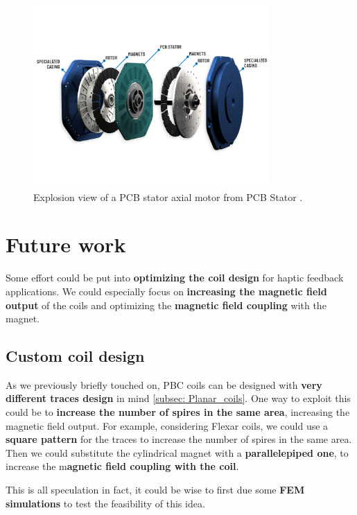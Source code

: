 \begin{figure}[H]
    \centering
    \includegraphics[width=0.8\textwidth]{Chapters/Chapter6/Figures/PCB_stator_motor_expl.png}
    \caption{Explosion view of a PCB stator axial motor from PCB Stator \cite{PCBStator}.}
    \label{fig:PCB_motor}
\end{figure}

\section{Future work}
Some effort could be put into \textbf{optimizing the coil design} for haptic feedback applications.
We could especially focus on \textbf{increasing the magnetic field output} of the coils and optimizing the \textbf{magnetic field coupling} with the magnet.

\subsection{Custom coil design}
As we previously briefly touched on, PBC coils can be designed with \textbf{very different traces design} in mind \ref{subsec: Planar_coils}.
One way to exploit this could be to \textbf{increase the number of spires in the same area}, increasing the magnetic field output.
For example, considering Flexar coils, we could use a \textbf{square pattern} for the traces to increase the number of spires in the same area.
Then we could substitute the cylindrical magnet with a \textbf{parallelepiped one}, to increase the m\textbf{agnetic field coupling with the coil}.

This is all speculation in fact, it could be wise to first due some \textbf{FEM simulations} to test the feasibility of this idea.